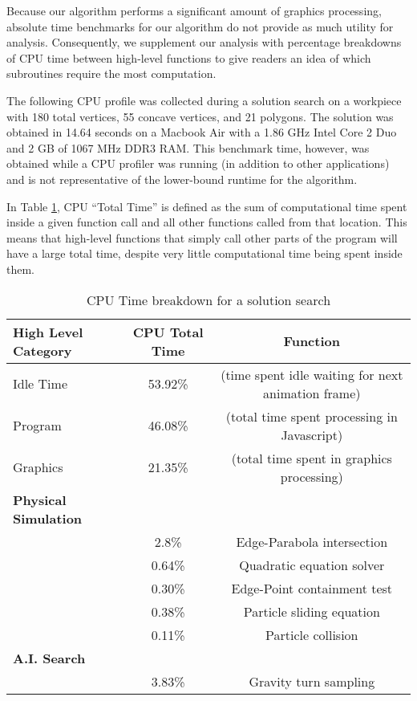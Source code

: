 Because our algorithm performs a significant amount of graphics processing, absolute time benchmarks for our algorithm do not provide as much utility for analysis. Consequently, we supplement our analysis with percentage breakdowns of CPU time between high-level functions to give readers an idea of which subroutines require the most computation.

The following CPU profile was collected during a solution search on a workpiece with 180 total vertices, 55 concave vertices, and 21 polygons. The solution was obtained in 14.64 seconds on a Macbook Air with a 1.86 GHz Intel Core 2 Duo and 2 GB of 1067 MHz DDR3 RAM. This benchmark time, however, was obtained while a CPU profiler was running (in addition to other applications) and is not representative of the lower-bound runtime for the algorithm.

In Table \ref{resultsTable}, CPU ``Total Time'' is defined as the sum of computational time spent inside a given function call and all other functions called from that location. This means that high-level functions that simply call other parts of the program will have a large total time, despite very little computational time being spent inside them.

\begin{table}[H]\label{resultsTable}
\centering
\def\arraystretch{1.2}
\begin{tabular}{|l|c|c|}
\hline
High Level Category & CPU Total Time & Function \\ \hline
Idle Time & 53.92\% & (time spent idle waiting for next animation frame) \\
Program & 46.08\% & (total time spent processing in Javascript) \\
Graphics & 21.35\% &  (total time spent in graphics processing) \\ \hline
\textbf{Physical Simulation} & ~ &  ~ \\ \hline
~ &  2.8\% &  Edge-Parabola intersection \\
~ &  0.64\% & Quadratic equation solver \\
~ &  0.30\% &  Edge-Point containment test \\
~ &  0.38\% & Particle sliding equation \\
~ &  0.11\% & Particle collision \\ \hline
\textbf{A.I. Search} & ~ & ~ \\ \hline
~ &  3.83\% & Gravity turn sampling \\
\hline
\end{tabular}
\caption{CPU Time breakdown for a solution search}
\end{table}

